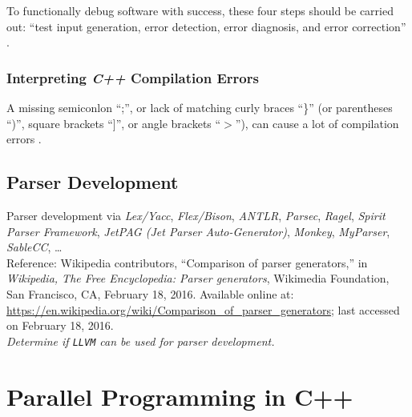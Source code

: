 	To  functionally debug software with success, these four steps should be carried out: ``test input generation, error detection, error diagnosis, and error correction'' \cite{Kirovski1997}. 
	
	

\subsubsection{Interpreting {\it C++} Compilation Errors}
\label{sssec:InterpretingCppCompilationErrors}

	A missing semiconlon ``;'', or lack of matching curly braces ``\}'' (or parentheses ``)'', square brackets ``]'', or angle brackets ``$>$''), can cause a lot of compilation errors \cite{Husted2000}.






\subsection{Parser Development}
\label{ssec:ParserDevelopment}

Parser development via {\it Lex/Yacc}, {\it Flex/Bison}, {\it ANTLR}, {\it Parsec}, {\it Ragel}, {\it Spirit Parser Framework}, {\it JetPAG (Jet Parser Auto-Generator)}, {\it Monkey}, {\it MyParser}, {\it SableCC}, \dots \\

	Reference: Wikipedia contributors, ``Comparison of parser generators,'' in {\it Wikipedia, The Free Encyclopedia: Parser generators}, Wikimedia Foundation, San Francisco, CA, February 18, 2016. Available online at: \url{https://en.wikipedia.org/wiki/Comparison_of_parser_generators}; last accessed on February 18, 2016. \\

{\it Determine if {\tt LLVM} can be used for parser development.}














\section{Parallel Programming in C++}
\label{sec:ParallelProgrammingInCpp}


